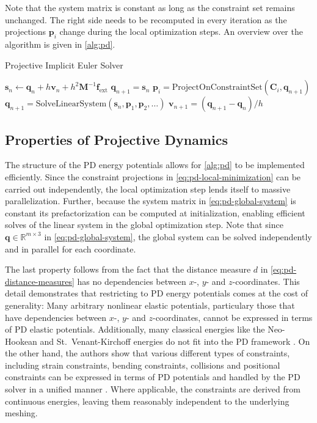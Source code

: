 Note that the system matrix is constant as long as the constraint set remains unchanged. The right side needs to be recomputed in every 
iteration as the projections $\bm{p}_i$ change during the local optimization steps.  An overview over the algorithm is given in \cref{alg:pd}.

\begin{algorithm}
\caption{Projective Implicit Euler Solver}\label{alg:pd}
\begin{algorithmic}
\State $\bm{s}_n \gets \bm{q}_n + h\bm{v}_n + h^2\bm{M}^{-1}\bm{f}_{\text{ext}}$
\State $\bm{q}_{n+1} = \bm{s}_n$
\State $\bm{p}_i = \text{ProjectOnConstraintSet}(\bm{C}_i, \bm{q}_{n+1}) $
\EndFor
\State $\bm{q}_{n+1} = \text{SolveLinearSystem}(\bm{s}_n, \bm{p}_1, \bm{p}_2, \ldots) $
\EndFor
\State $\bm{v}_{n+1} = (\bm{q}_{n+1} - \bm{q}_n) / h$
\end{algorithmic}
\end{algorithm}

\subsection{Properties of Projective Dynamics}\label{ss:pd-properties}
The structure of the PD energy potentials allows for \cref{alg:pd} to be implemented efficiently. Since the constraint projections
in \cref{eq:pd-local-minimization} can be carried out independently, the local optimization step lends itself to massive parallelization. 
Further, because the system matrix in \cref{eq:pd-global-system} is constant its prefactorization can be computed at initialization, enabling
efficient solves of the linear system in the global optimization step. Note that since $\bm{q} \in \mathbb{R}^{m \times 3}$ in \cref{eq:pd-global-system}, 
the global system can be solved independently and in parallel for each coordinate.

The last property follows from the fact that the distance measure $d$ in \cref{eq:pd-distance-measures} has no dependencies between 
$x$-, $y$- and $z$-coordinates. This detail demonstrates that restricting to PD energy potentials comes at the cost of generality: 
Many arbitrary nonlinear elastic potentials, particulary those that have dependencies between $x$-, $y$- and $z$-coordinates, cannot be expressed 
in terms of PD elastic potentials. Additionally, many classical energies like the Neo-Hookean and St.\ Venant-Kirchoff energies do not fit 
into the PD framework \cite{liu2017}. On the other hand, the authors show that various different types of constraints, including strain constraints, 
bending constraints, collisions and positional constraints can be expressed in terms of PD potentials and handled by the PD solver in a 
unified manner \cite{bouaziz2014}. Where applicable, the constraints are derived from continuous energies, leaving them reasonably independent 
to the underlying meshing.

